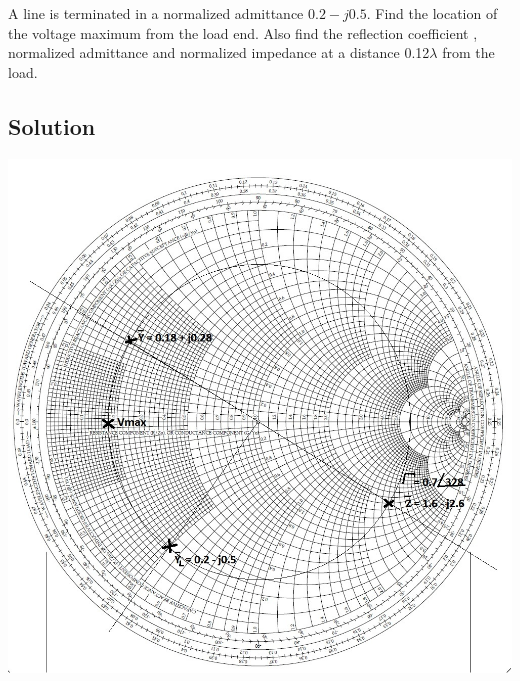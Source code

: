 \begin{example}
A line is terminated in a normalized admittance $0.2-j0.5$. Find the location of the voltage maximum from the load  end. Also find the reflection coefficient , normalized admittance and normalized impedance at a distance 0.12$\lambda$ from the load.

\subsection*{Solution}

\begin{center}
\centering
\includegraphics[width=1\linewidth]{"./graphics/smith chart 3"}
\end{center}


\end{example}
